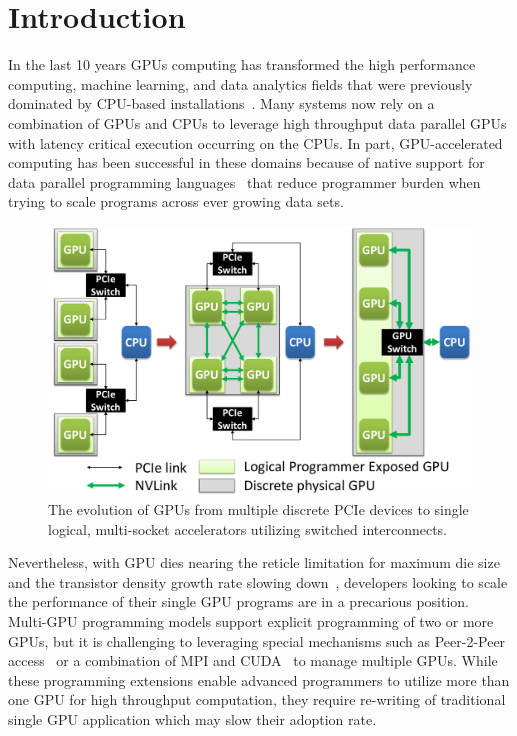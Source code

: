 \section{Introduction}
\label{introduction}

In the last 10 years GPUs computing has transformed the high performance 
computing, machine learning, and data analytics fields that were previously 
dominated by CPU-based 
installations~\cite{intersect360,cudnn,Lavin15b,SimonyanZ14a}. Many systems now 
rely on a combination of GPUs and CPUs to leverage high throughput data parallel 
GPUs with latency critical execution occurring on the CPUs. In part, 
GPU-accelerated computing has been successful in these domains because of native 
support for data parallel programming languages~\cite{CUDA7,OPENCL} that reduce 
programmer burden when trying to scale programs across ever growing data sets.

\begin{figure}[t]
\centering
\includegraphics[width=1.0\columnwidth]{figures/inter_gpu_connections.pdf}
\caption{The evolution of GPUs from multiple discrete PCIe devices to 
single logical, multi-socket accelerators utilizing switched interconnects.}
\label{fig:systemdiagram}
\vspace{-.2in}
\end{figure}

Nevertheless, with GPU dies nearing the reticle limitation for maximum die size 
and the transistor density growth rate slowing down~\cite{mooredead2016}, 
developers looking to scale the performance of their single GPU programs are 
in 
a precarious position. Multi-GPU programming models support explicit 
programming 
of two or more GPUs, but it is challenging to leveraging special mechanisms 
such 
as Peer-2-Peer access~\cite{NVIDIAP2P} or a combination of MPI and 
CUDA~\cite{NVIDIAMPI} to manage multiple GPUs. While these programming 
extensions enable advanced programmers to utilize more than one GPU for high 
throughput computation, they require re-writing of traditional single GPU 
application which may slow their adoption rate.

